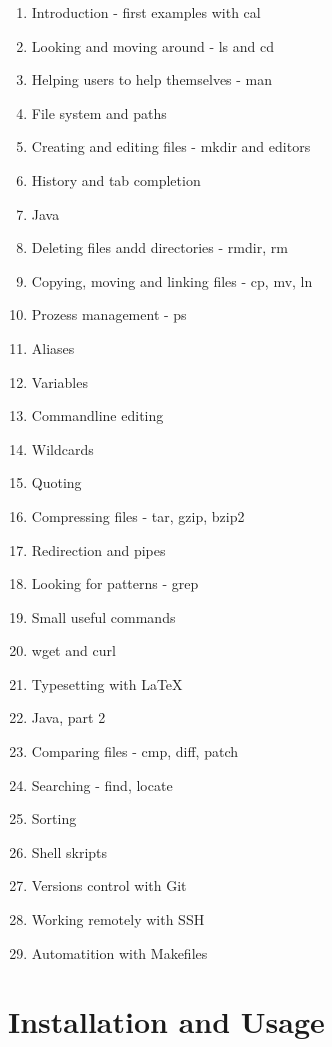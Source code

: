 \documentclass[paper=a4,twoside,abstract=on,cleardoublepage=empty,numbers=noenddot,toc=bib,toc=listof,12pt,appendixprefix=true]{scrreprt}
\begin{document}
\begin{multicols}{2}
    \footnotesize
    \begin{enumerate}
        \item Introduction - first examples with cal
        \item Looking and moving around - ls and cd
        \item Helping users to help themselves - man
        \item File system and paths
        \item Creating and editing files - mkdir and editors
        \item History and tab completion
        \item Java
        \item Deleting files andd directories - rmdir, rm
        \item Copying, moving and linking files - cp, mv, ln
        \item Prozess management - ps
        \item Aliases
        \item Variables
        \item Commandline editing
        \item Wildcards
        \item Quoting
        \item Compressing files - tar, gzip, bzip2
        \item Redirection and pipes
        \item Looking for patterns - grep
        \item Small useful commands
        \item wget and curl
        \item Typesetting with LaTeX
        \item Java, part 2
        \item Comparing files - cmp, diff, patch
        \item Searching - find, locate
        \item Sorting
        \item Shell skripts
        \item Versions control with Git
        \item Working remotely with SSH
        \item Automatition with Makefiles
    \end{enumerate}
\end{multicols}

\chapter{Installation and Usage}
\label{sec:usage}
\end{document}
